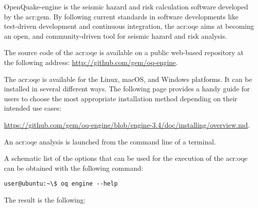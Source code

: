 OpenQuake-engine is the seismic hazard and risk calculation software developed by
the \glsdesc{acr:gem}. By following current standards in software
developments like test-driven development and continuous integration, the
\glsdesc{acr:oqe} aims at becoming an open, and community-driven tool for
seismic hazard and risk analysis.

The source code of the \glsdesc{acr:oqe} is available on a public web-based
repository at the following address:
\href{http://github.com/gem/oq-engine}{http://github.com/gem/oq-engine}.

The \glsdesc{acr:oqe} is available for the Linux, macOS, and Windows
platforms. It can be installed in several different ways. The following page
provides a handy guide for users to choose the most appropriate installation
method depending on their intended use cases:

\href{https://github.com/gem/oq-engine/blob/engine-3.4/doc/installing/overview.md}{https://github.com/gem/oq-engine/blob/engine-3.4/doc/installing/overview.md}.

An \gls{acr:oqe} analysis is launched from the command line of a terminal.

A schematic list of the options that can be used for the execution of the
\gls{acr:oqe} can be obtained with the following command:

\begin{verbatim}
user@ubuntu:~\$ oq engine --help
\end{verbatim}

The result is the following:
\inputminted[firstline=1,fontsize=\footnotesize,frame=single]{shell-session}{oqum/help.txt}
